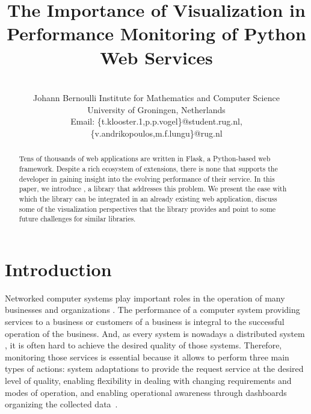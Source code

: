 \documentclass[conference]{IEEEtran}
\begin{document}
\title{The Importance of Visualization in Performance Monitoring of Python Web Services}

\author{
\\
Johann Bernoulli Institute for Mathematics and Computer Science\\
University of Groningen, Netherlands\\
Email: \{t.klooster.1,p.p.vogel\}@student.rug.nl, 
\{v.andrikopoulos,m.f.lungu\}@rug.nl 
}


\maketitle

\begin{abstract}
  Tens of thousands of web applications are written in Flask, a Python-based web framework. Despite a rich ecosystem of extensions, there is none that supports the developer in gaining insight into the evolving performance of their service. In this paper, we introduce \tool, a library that addresses this problem. We present the ease with which the library can be integrated in an already existing web application, discuss some of the visualization perspectives that the library provides and point to some future challenges for similar libraries.
\end{abstract}


\section{Introduction}


Networked computer systems play important roles in the operation of many businesses and organizations \cite{davenport1998working}. 
The performance of a computer system providing services to a business or customers of a business is integral to the successful operation of the business.
And, as every system is nowadays a distributed system \cite{cavage2013there}, it is often hard to achieve the desired quality of those systems. 
Therefore, monitoring those services is essential because it allows to perform three main types of actions: system adaptations to provide the request service at the desired level of quality, enabling flexibility in dealing with changing requirements and modes of operation, and enabling operational awareness through dashboards organizing the collected data~\cite{pernici2016monitoring}.
\end{document}
